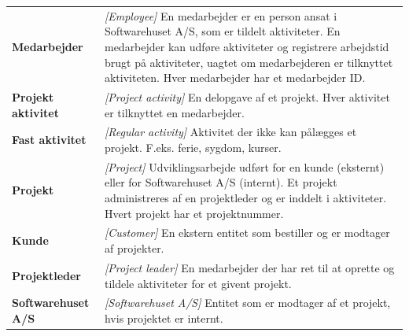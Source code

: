 \begin{table}[H]
    \centering
    \setlength{\extrarowheight}{8pt}
    \begin{tabular}{>{\bfseries}l p{}}
        Medarbejder           & \textit{[Employee]} En medarbejder er en person ansat i Softwarehuset A/S, som er tildelt aktiviteter. En medarbejder kan udføre aktiviteter og registrere arbejdstid brugt på aktiviteter, uagtet om medarbejderen er tilknyttet aktiviteten. Hver medarbejder har et medarbejder ID.                                         \\
        Projekt aktivitet     & \textit{[Project activity]} En delopgave af et projekt. Hver aktivitet er tilknyttet en medarbejder.                                                                                                                                                                                                                           \\
        Fast aktivitet        & \textit{[Regular activity]} Aktivitet der ikke kan pålægges et projekt. F.eks. ferie, sygdom, kurser.                                                                                                                                                                                                                          \\
        Projekt               & \textit{[Project]} Udviklingsarbejde udført for en kunde (eksternt) eller for Softwarehuset A/S (internt). Et projekt administreres af en projektleder og er inddelt i aktiviteter. Hvert projekt har et projektnummer.                                                                                                        \\
        Kunde                 & \textit{[Customer]} En ekstern entitet som bestiller og er modtager af projekter.                                                                                                                                                                                                                                              \\
        Projektleder          & \textit{[Project leader]} En medarbejder der har ret til at oprette og tildele aktiviteter for et givent projekt.                                                                                                                                                                                                              \\
        Softwarehuset A/S     & \textit{[Softwarehuset A/S]} Entitet som er modtager af et projekt, hvis projektet er internt.                                                                                                                                                                                                                                 \\

\end{tabular}
\end{table}
